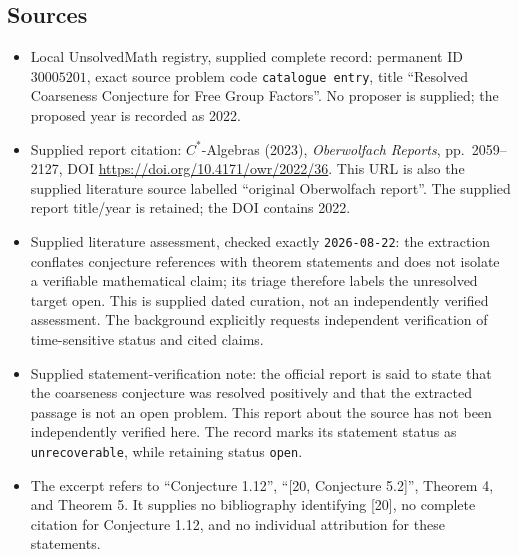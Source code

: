 \documentclass[11pt]{article}
\begin{document}
\subsection{Sources}
\begin{itemize}
\item Local UnsolvedMath registry, supplied complete record: permanent ID \(30005201\), exact source problem code \texttt{catalogue entry}, title ``Resolved Coarseness Conjecture for Free Group Factors''. No proposer is supplied; the proposed year is recorded as 2022.
\item Supplied report citation: \(C^*\)-Algebras (2023), \emph{Oberwolfach Reports}, pp.\ 2059--2127, DOI \url{https://doi.org/10.4171/owr/2022/36}. This URL is also the supplied literature source labelled ``original Oberwolfach report''. The supplied report title/year is retained; the DOI contains 2022.
\item Supplied literature assessment, checked exactly \texttt{2026-08-22}: the extraction conflates conjecture references with theorem statements and does not isolate a verifiable mathematical claim; its triage therefore labels the unresolved target open. This is supplied dated curation, not an independently verified assessment. The background explicitly requests independent verification of time-sensitive status and cited claims.
\item Supplied statement-verification note: the official report is said to state that the coarseness conjecture was resolved positively and that the extracted passage is not an open problem. This report about the source has not been independently verified here. The record marks its statement status as \texttt{unrecoverable}, while retaining status \texttt{open}.
\item The excerpt refers to ``Conjecture 1.12'', ``[20, Conjecture 5.2]'', Theorem 4, and Theorem 5. It supplies no bibliography identifying [20], no complete citation for Conjecture 1.12, and no individual attribution for these statements.
\end{itemize}
\end{document}
